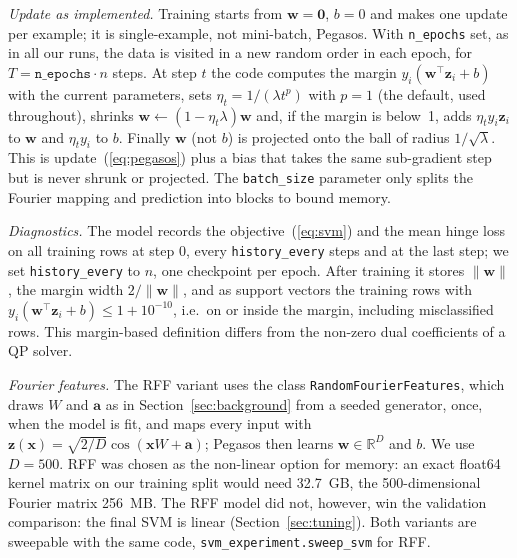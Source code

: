 \documentclass[10pt,twocolumn,a4paper]{article}
\begin{document}
\textit{Update as implemented.} Training starts from
$\mathbf{w} = \mathbf{0}$, $b = 0$ and makes one update per example; it is
single-example, not mini-batch, Pegasos. %
With \texttt{n\_epochs} set, as in all our runs, the data is visited in a
new random order in each epoch, for $T = \texttt{n\_epochs}\cdot n$
steps. %
At step $t$ the code computes the margin $y_i(\mathbf{w}^\top\mathbf{z}_i + b)$
with the current parameters, sets $\eta_t = 1/(\lambda t^{p})$ with
$p = 1$ (the default, used throughout), shrinks
$\mathbf{w} \leftarrow (1 - \eta_t\lambda)\mathbf{w}$ and, if the margin
is below~1, adds $\eta_t y_i \mathbf{z}_i$ to $\mathbf{w}$ and
$\eta_t y_i$ to $b$. %
Finally $\mathbf{w}$ (not $b$) is projected onto the ball of radius
$1/\sqrt{\lambda}$. %
This is update~(\ref{eq:pegasos}) plus a bias that takes the same
sub-gradient step but is never shrunk or projected. The
\texttt{batch\_size} parameter only splits the Fourier mapping and
prediction into blocks to bound memory. %

\textit{Diagnostics.} The model records the objective~(\ref{eq:svm}) and
the mean hinge loss on all training rows at step 0, every
\texttt{history\_every} steps and at the last step; %
we set \texttt{history\_every} to $n$, one checkpoint per epoch. %
After training it stores $\lVert\mathbf{w}\rVert$, the margin width
$2/\lVert\mathbf{w}\rVert$, and as support vectors the training rows with
$y_i(\mathbf{w}^\top\mathbf{z}_i + b) \le 1 + 10^{-10}$, i.e.\ on or
inside the margin, including misclassified rows. This margin-based
definition differs from the non-zero dual coefficients of a QP
solver. %

\textit{Fourier features.} The RFF variant uses the class
\texttt{RandomFourierFeatures}, which draws $W$ and $\mathbf{a}$ as in
Section~\ref{sec:background} from a seeded generator, once, when the model
is fit, and maps every input with $\mathbf{z}(\mathbf{x})=\sqrt{2/D}\cos(\mathbf{x}W+\mathbf{a})$; %
Pegasos then learns $\mathbf{w} \in \mathbb{R}^D$ and $b$. We use
$D = 500$. %
RFF was chosen as the non-linear option for memory: an exact float64
kernel matrix on our training split would need 32.7~GB, %
the 500-dimensional Fourier matrix 256~MB. %
The RFF model did not, however, win the validation comparison: the final
SVM is linear (Section~\ref{sec:tuning}). Both variants are sweepable
with the same code, \texttt{svm\_experiment.sweep\_svm} for RFF. %
\end{document}
